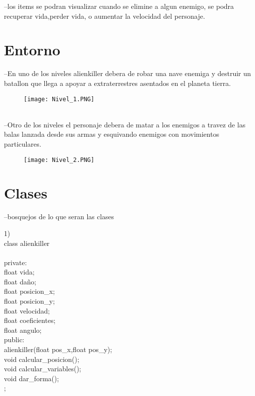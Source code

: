 \documentclass{article}
\begin{document}
--los items  se podran visualizar cuando se elimine a algun enemigo, se podra recuperar vida,perder vida, o aumentar la velocidad del personaje.


\section{Entorno} \label{intro}

--En uno de los niveles alienkiller debera de robar una nave enemiga y destruir un batallon que llega a apoyar a extraterrestres asentados en el planeta tierra.\\

\begin{figure}[h]
\texttt{[image: Nivel\_1.PNG]}
\centering
\end{figure}


\\--Otro de los niveles el personaje debera de matar a los enemigos a travez de las balas lanzada desde sus armas y esquivando enemigos con movimientos particulares.

\begin{figure}[h]
\texttt{[image: Nivel\_2.PNG]}
\centering
\end{figure}

\section{Clases} \label{intro}

--bosquejos de lo que seran las clases


1)\\
class alienkiller\\
{\\
private:\\
    float vida;\\
    float daño;\\
    float posicion_x;\\
    float posicion_y;\\
    float velocidad;\\
    float coeficientes;\\
    float angulo;\\
    
        
public:\\
    alienkiller(float pos_x,float pos_y);\\
    void calcular_posicion();\\
    void calcular_variables();\\
    void dar_forma();\\
    
};\\
\end{document}
